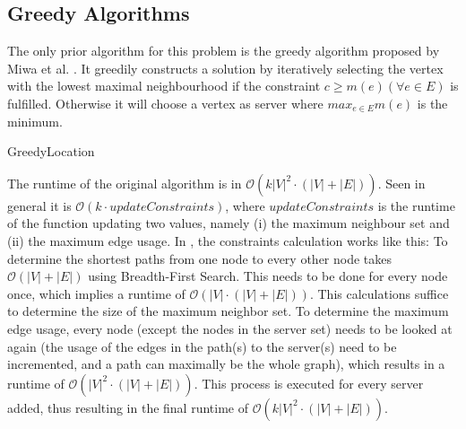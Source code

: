\documentclass [12pt]{article}
\begin{document}
\subsection{Greedy Algorithms}
The only prior algorithm for this problem is the greedy algorithm proposed by
Miwa et al. \cite{mirrorserver}. It greedily constructs a solution by iteratively selecting the vertex with the 
lowest maximal neighbourhood if the constraint $c\geq m(e) (\forall e \in E)$ is fulfilled. 
Otherwise it will choose a vertex as server where $max_{e \in E}m(e)$ is the minimum.
\begin{algorithm}[H]
  \caption{GreedyLocation}
\end{algorithm}
The runtime of the original algorithm is in $\mathcal O(k|V|^{2} \cdot (|V|+|E|))$. Seen in general it is $\mathcal O(k \cdot updateConstraints)$, where
$updateConstraints$ is the runtime of the function updating two values, namely (i) the maximum neighbour set and (ii) the maximum edge usage. 
In \cite{mirrorserver}, the constraints calculation works like this:
To determine the shortest paths from one node to every other node takes 
$\mathcal O(|V|+|E|)$ using Breadth-First Search. This needs to be done for every node once,
which implies a runtime of $\mathcal O(|V| \cdot (|V|+|E|))$. 
This calculations suffice to determine the size of the maximum neighbor set. To determine the maximum
edge usage, every node (except the nodes in the server set) needs to be looked 
at again (the usage of the edges in the
path(s) to the server(s) need to be incremented, and a path can maximally be the whole graph), 
which results in a runtime of $\mathcal O(|V|^{2} \cdot (|V|+|E|))$.   
This process is executed for every server added, thus resulting in the final runtime of
$\mathcal O(k|V|^{2} \cdot (|V|+|E|))$. 
\end{document}
